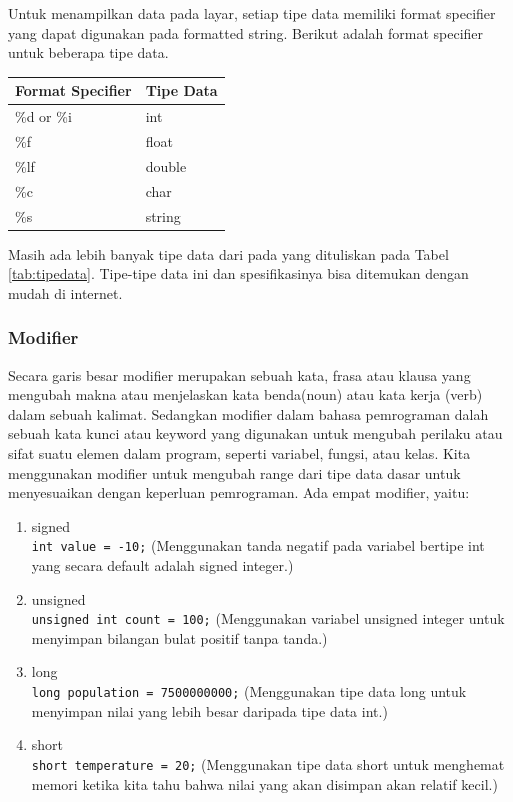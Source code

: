 Untuk menampilkan data pada layar, setiap tipe data memiliki format specifier yang dapat digunakan pada formatted string. Berikut adalah format specifier untuk beberapa tipe data.
\begin{center}
	\begin{tabular}{|l|l|}
		\hline
		Format Specifier & Tipe Data   \\ \hline
		\%d or \%i       & int          \\ \hline
		\%f              & float        \\ \hline
		\%lf             & double       \\ \hline
		\%c              & char         \\ \hline
		\%s              & string \\ \hline
	\end{tabular}
\end{center}
Masih ada lebih banyak tipe data dari pada yang dituliskan pada Tabel \ref{tab:tipedata}. Tipe-tipe data ini dan spesifikasinya bisa ditemukan dengan mudah di internet.

\subsubsection{Modifier}
Secara garis besar modifier merupakan sebuah kata, frasa atau klausa yang mengubah makna atau menjelaskan kata benda(noun) atau kata kerja (verb) dalam sebuah kalimat. 
Sedangkan modifier dalam bahasa pemrograman dalah sebuah kata kunci atau keyword yang digunakan untuk mengubah perilaku atau sifat suatu elemen dalam program, seperti variabel, fungsi, atau kelas.
Kita menggunakan modifier untuk mengubah range dari tipe data dasar untuk menyesuaikan dengan keperluan pemrograman. Ada empat modifier, yaitu:
\begin{enumerate}
	\item signed \\
	\verb|int value = -10;| (Menggunakan tanda negatif pada variabel bertipe int yang secara default adalah signed integer.)
	\item unsigned \\
	\verb|unsigned int count = 100;|  (Menggunakan variabel unsigned integer untuk menyimpan bilangan bulat positif tanpa tanda.)
	\item long \\ 
	\verb|long population = 7500000000;| (Menggunakan tipe data long untuk menyimpan nilai yang lebih besar daripada tipe data int.)
	\item short \\
	\verb|short temperature = 20;| (Menggunakan tipe data short untuk menghemat memori ketika kita tahu bahwa nilai yang akan disimpan akan relatif kecil.)
\end{enumerate}


